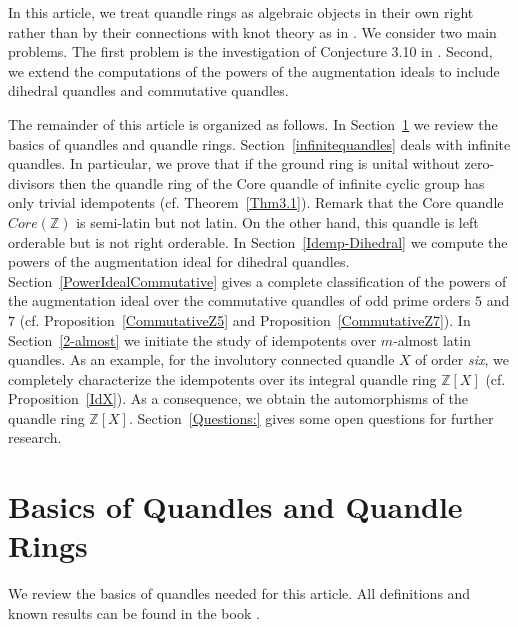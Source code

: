 \documentclass[12pt]{amsart}
\theoremstyle{definition}
\theoremstyle{remark}
\newcommand{\Z}{\mathbb{Z}}
\begin{document}
 In this article, we treat quandle rings as algebraic objects in their own right rather than by their connections with knot theory as in \cite{ENS, ES}.  We consider two main problems.  The first problem is the investigation of Conjecture 3.10 in \cite{ENSS}.  Second,  we extend the computations of the powers of the augmentation ideals  to include dihedral quandles and commutative quandles.  
 
 The remainder of this article is organized as follows.  In Section~\ref{review} we review the basics of quandles and quandle rings.  Section~\ref{infinitequandles} deals with infinite quandles.  In particular, we prove that if the ground ring is unital without zero-divisors then the quandle ring of the Core quandle of infinite cyclic group  has only trivial idempotents (cf. Theorem~\ref{Thm3.1}). Remark  that the Core quandle $Core(\Z)$ is semi-latin but not latin. On the other hand, this quandle is left orderable but is not right orderable.  In Section~\ref{Idemp-Dihedral} we compute the powers of the augmentation ideal for dihedral quandles.  Section~\ref{PowerIdealCommutative} gives a complete classification of the powers of the augmentation ideal over the commutative quandles of odd prime orders $5$ and $7$ (cf. Proposition~\ref{CommutativeZ5} and Proposition~\ref{CommutativeZ7}).  In Section~\ref{2-almost} we initiate the study of idempotents over $m$-almost latin quandles.  As an example, for the involutory connected quandle $X$ of order \emph{six},  we completely characterize the idempotents over its integral quandle ring $\mathbb{Z}[X]$ (cf. Proposition~\ref{IdX}).  As a consequence, we obtain the automorphisms of the quandle ring $\mathbb{Z}[X]$.  Section~\ref{Questions:} gives some open questions for further research.


\section{Basics of Quandles and Quandle Rings}\label{review}
We review the basics of quandles needed for this article. All definitions and known results can be found in the book \cite{BES}.
\end{document}
